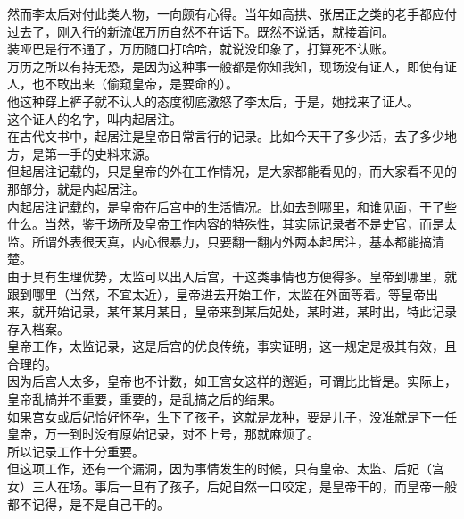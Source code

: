 \begin{multicols}{\theparacolNo}
然而李太后对付此类人物，一向颇有心得。当年如高拱、张居正之类的老手都应付过去了，刚入行的新流氓万历自然不在话下。既然不说话，就接着问。\\

装哑巴是行不通了，万历随口打哈哈，就说没印象了，打算死不认账。\\

万历之所以有持无恐，是因为这种事一般都是你知我知，现场没有证人，即使有证人，也不敢出来（偷窥皇帝，是要命的）。\\

他这种穿上裤子就不认人的态度彻底激怒了李太后，于是，她找来了证人。\\

这个证人的名字，叫内起居注。\\

在古代文书中，起居注是皇帝日常言行的记录。比如今天干了多少活，去了多少地方，是第一手的史料来源。\\

但起居注记载的，只是皇帝的外在工作情况，是大家都能看见的，而大家看不见的那部分，就是内起居注。\\

内起居注记载的，是皇帝在后宫中的生活情况。比如去到哪里，和谁见面，干了些什么。当然，鉴于场所及皇帝工作内容的特殊性，其实际记录者不是史官，而是太监。所谓外表很天真，内心很暴力，只要翻一翻内外两本起居注，基本都能搞清楚。\\

由于具有生理优势，太监可以出入后宫，干这类事情也方便得多。皇帝到哪里，就跟到哪里（当然，不宜太近），皇帝进去开始工作，太监在外面等着。等皇帝出来，就开始记录，某年某月某日，皇帝来到某后妃处，某时进，某时出，特此记录存入档案。\\

皇帝工作，太监记录，这是后宫的优良传统，事实证明，这一规定是极其有效，且合理的。\\

因为后宫人太多，皇帝也不计数，如王宫女这样的邂逅，可谓比比皆是。实际上，皇帝乱搞并不重要，重要的，是乱搞之后的结果。\\

如果宫女或后妃恰好怀孕，生下了孩子，这就是龙种，要是儿子，没准就是下一任皇帝，万一到时没有原始记录，对不上号，那就麻烦了。\\

所以记录工作十分重要。\\

但这项工作，还有一个漏洞，因为事情发生的时候，只有皇帝、太监、后妃（宫女）三人在场。事后一旦有了孩子，后妃自然一口咬定，是皇帝干的，而皇帝一般都不记得，是不是自己干的。\\


\end{multicols}
